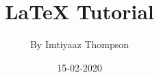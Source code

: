 \documentclass[a4paper,12pt,landscape,twocolumn]{book}
\begin{document}
\title{\Large{\textbf{LaTeX Tutorial}}}
\author{By Imtiyaaz Thompson}
\date{15-02-2020}

\maketitle

\blindtext[5]
\end{document}
